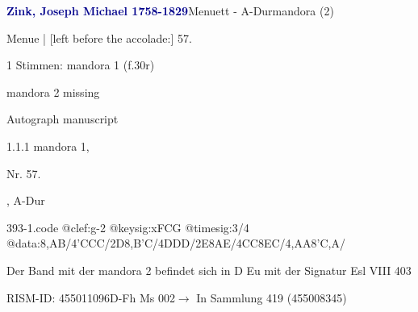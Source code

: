 \documentclass[twocolumn]{book}
\begin{document}
\par \vspace{7pt} \textcolor{darkblue}{\textbf{Zink, Joseph Michael  1758-1829}}\hfillplus{\textbf{[393]}}\newline Menuett - A-Dur\newline mandora (2)
\par \begin{itshape}[f.30r, at left:] Menue | [left before the accolade:] 57.\end{itshape} 
\par \textcolor{darkblue}{}  1 Stimmen: mandora 1  (f.30r)\newline \begin{small} mandora 2 missing\end{small} \newline Autograph manuscript
\par 1.1.1  mandora 1, \begin{itshape}Nr. 57.\end{itshape}, A-Dur  
\begin{filecontents*}{393-1.code}
@clef:g-2
@keysig:xFCG
@timesig:3/4
@data:{8,AB}/4'CCC/2D{8,B'C}/4DDD/2E{8AE}/4CC{8EC}/4,AA{8'C,A}/
\end{filecontents*}
\newline
%
\par Der Band mit der mandora 2 befindet sich in D Eu mit der Signatur Esl VIII 403
\par RISM-ID: 455011096\newline D-Fh  Ms 002\newline $\rightarrow$ In Sammlung 419 (455008345)
      
\end{document}
